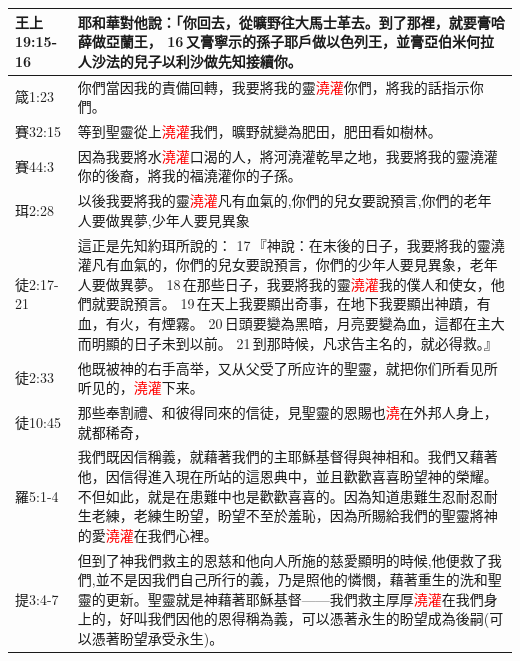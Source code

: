 \begin{table}[H]
\begin{tabular}{p{4em}|p{45em}}
王上19:15-16&耶和華對他說：「你回去，從曠野往大馬士革去。到了那裡，就要膏哈薛做亞蘭王， 16 又膏寧示的孫子耶戶做以色列王，並膏亞伯米何拉人沙法的兒子以利沙做先知接續你。\\  \midrule

箴1:23&你們當因我的責備回轉，我要將我的靈\textcolor{red}{澆灌}你們，將我的話指示你們。\\  \midrule
賽32:15&等到聖靈從上\textcolor{red}{澆灌}我們，曠野就變為肥田，肥田看如樹林。\\  \midrule
賽44:3&因為我要將水\textcolor{red}{澆灌}口渴的人，將河澆灌乾旱之地，我要將我的靈澆灌你的後裔，將我的福澆灌你的子孫。\\  \midrule
珥2:28&以後我要將我的靈\textcolor{red}{澆灌}凡有血氣的,你們的兒女要說預言,你們的老年人要做異夢,少年人要見異象\\  \midrule
徒2:17-21&這正是先知約珥所說的： 17 『神說：在末後的日子，我要將我的靈澆灌凡有血氣的，你們的兒女要說預言，你們的少年人要見異象，老年人要做異夢。 18 在那些日子，我要將我的靈\textcolor{red}{澆灌}我的僕人和使女，他們就要說預言。 19 在天上我要顯出奇事，在地下我要顯出神蹟，有血，有火，有煙霧。 20 日頭要變為黑暗，月亮要變為血，這都在主大而明顯的日子未到以前。 21 到那時候，凡求告主名的，就必得救。』\\  \midrule
徒2:33&他既被神的右手高举，又从父受了所应许的聖靈，就把你们所看见所听见的，\textcolor{red}{澆灌}下来。\\  \midrule
徒10:45&那些奉割禮、和彼得同來的信徒，見聖靈的恩賜也\textcolor{red}{澆}在外邦人身上，就都稀奇，\\  \midrule
羅5:1-4&我們既因信稱義，就藉著我們的主耶穌基督得與神相和。我們又藉著他，因信得進入現在所站的這恩典中，並且歡歡喜喜盼望神的榮耀。不但如此，就是在患難中也是歡歡喜喜的。因為知道患難生忍耐忍耐生老練，老練生盼望，盼望不至於羞恥，因為所賜給我們的聖靈將神的愛\textcolor{red}{澆灌}在我們心裡。\\  \midrule
提3:4-7&但到了神我們救主的恩慈和他向人所施的慈愛顯明的時候,他便救了我們,並不是因我們自己所行的義，乃是照他的憐憫，藉著重生的洗和聖靈的更新。聖靈就是神藉著耶穌基督——我們救主厚厚\textcolor{red}{澆灌}在我們身上的，好叫我們因他的恩得稱為義，可以憑著永生的盼望成為後嗣(可以憑著盼望承受永生)。\\  \midrule
\end{tabular}
\end{table}


